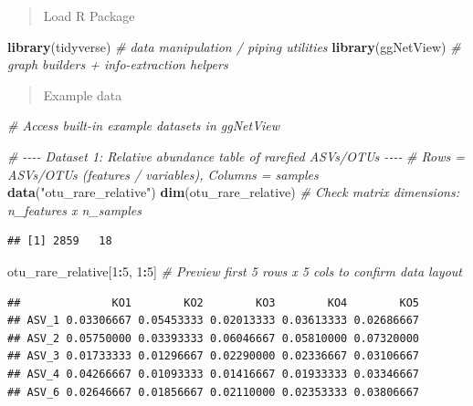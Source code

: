 \documentclass[
]{book}
\newenvironment{Shaded}{\begin{snugshade}}{\end{snugshade}}
\newcommand{\CommentTok}[1]{\textcolor[rgb]{0.56,0.35,0.01}{\textit{#1}}}
\newcommand{\DecValTok}[1]{\textcolor[rgb]{0.00,0.00,0.81}{#1}}
\newcommand{\FunctionTok}[1]{\textcolor[rgb]{0.13,0.29,0.53}{\textbf{#1}}}
\newcommand{\NormalTok}[1]{#1}
\newcommand{\SpecialCharTok}[1]{\textcolor[rgb]{0.81,0.36,0.00}{\textbf{#1}}}
\newcommand{\StringTok}[1]{\textcolor[rgb]{0.31,0.60,0.02}{#1}}
\begin{document}
\begin{quote}
Load R Package
\end{quote}

\begin{Shaded}
\begin{Highlighting}[]
\FunctionTok{library}\NormalTok{(tidyverse)   }\CommentTok{\# data manipulation / piping utilities}
\FunctionTok{library}\NormalTok{(ggNetView)   }\CommentTok{\# graph builders + info{-}extraction helpers}
\end{Highlighting}
\end{Shaded}

\begin{quote}
Example data
\end{quote}

\begin{Shaded}
\begin{Highlighting}[]
\CommentTok{\# Access built{-}in example datasets in ggNetView}

\CommentTok{\# {-}{-}{-}{-} Dataset 1: Relative abundance table of rarefied ASVs/OTUs {-}{-}{-}{-}}
\CommentTok{\# Rows = ASVs/OTUs (features / variables), Columns = samples}
\FunctionTok{data}\NormalTok{(}\StringTok{"otu\_rare\_relative"}\NormalTok{)}
\FunctionTok{dim}\NormalTok{(otu\_rare\_relative)  }\CommentTok{\# Check matrix dimensions: n\_features x n\_samples }
\end{Highlighting}
\end{Shaded}

\begin{verbatim}
## [1] 2859   18
\end{verbatim}

\begin{Shaded}
\begin{Highlighting}[]
\NormalTok{otu\_rare\_relative[}\DecValTok{1}\SpecialCharTok{:}\DecValTok{5}\NormalTok{, }\DecValTok{1}\SpecialCharTok{:}\DecValTok{5}\NormalTok{] }\CommentTok{\# Preview first 5 rows x 5 cols to confirm data layout}
\end{Highlighting}
\end{Shaded}

\begin{verbatim}
##              KO1        KO2        KO3        KO4        KO5
## ASV_1 0.03306667 0.05453333 0.02013333 0.03613333 0.02686667
## ASV_2 0.05750000 0.03393333 0.06046667 0.05810000 0.07320000
## ASV_3 0.01733333 0.01296667 0.02290000 0.02336667 0.03106667
## ASV_4 0.04266667 0.01093333 0.01416667 0.01933333 0.03346667
## ASV_6 0.02646667 0.01856667 0.02110000 0.02353333 0.03806667
\end{verbatim}
\end{document}
